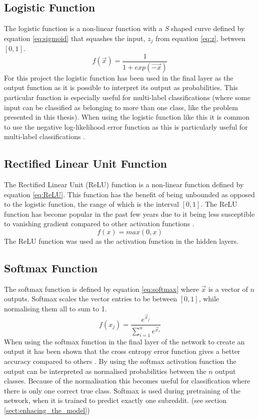 \subsection{Logistic Function}\label{sec:sigmoid_function}
The logistic function is a non-linear function with a \textit{S} shaped curve defined by equation \ref{eq:sigmoid} that squashes the input, $z_j$ from equation \ref{eq:z}, between $[0, 1]$.
\begin{equation}\label{eq:sigmoid}
    f(\vec{x})=\frac{1}{1+exp(\vec{-x})}
\end{equation}
For this project the logistic function has been used in the final layer as the output function as it is possible to interpret its output as probabilities. This particular function is especially useful for multi-label classifications (where some input can be classified as belonging to more than one class, like the problem presented in this thesis). When using the logistic function like this it is common to use the negative log-likelihood error function as this is particularly useful for multi-label classifications \parencite{bishop1995neural}.

\subsection{Rectified Linear Unit Function}\label{sec:relu}
The Rectified Linear Unit (ReLU) function is a non-linear function defined by equation \ref{eq:ReLU}. This function has the benefit of being unbounded as opposed to the logistic function, the range of which is the interval $[0, 1]$. The ReLU function has become popular in the past few years due to it being less susceptible to vanishing gradient compared to other activation functions \parencite{glorot2011deep, lecun2015deep}.
\begin{equation}\label{eq:ReLU}
    f(x) = max(0,x)
\end{equation}
The ReLU function was used as the activation function in the hidden layers.

\subsection{Softmax Function}\label{sec:softmax_function}
The softmax function is defined by equation \ref{eq:softmax} where $\vec{x}$ is a vector of $n$ outputs. Softmax scales the vector entries to be between $[0,1]$, while normalising them all to sum to 1.
\begin{equation} \label{eq:softmax}
    f(x_j) = \frac{e^{\vec{x}_j}}{\sum_{i=1}^{n} e^{\vec{x}_i}}
\end{equation}
When using the softmax function in the final layer of the network to create an output it has been shown that the cross entropy error function gives a better accuracy compared to others \parencite{dunne1997pairing,golik2013cross}. By using the softmax activation function the output can be interpreted as normalised probabilities between the $n$ output classes. Because of the normalisation this becomes useful for classification where there is only one correct true class. Softmax is used during pretraining of the network, when it is trained to predict exactly one subreddit. (see section \ref{sect:enhacing_the_model})

